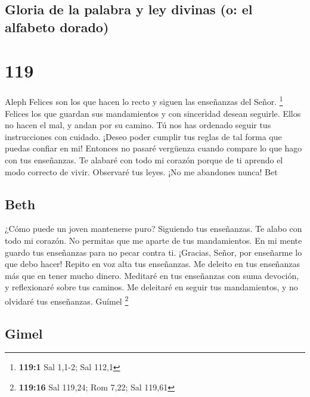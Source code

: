 \hypertarget{gloria-de-la-palabra-y-ley-divinas-o-el-alfabeto-dorado}{%
\subsection{Gloria de la palabra y ley divinas (o: el alfabeto
dorado)}\label{gloria-de-la-palabra-y-ley-divinas-o-el-alfabeto-dorado}}

\hypertarget{section-118}{%
\section{119}\label{section-118}}

Aleph  Felices son los que hacen lo recto y siguen las
enseñanzas del Señor. \footnote{\textbf{119:1} Sal 1,1-2; Sal 112,1}
 Felices los que guardan sus mandamientos y con sinceridad
desean seguirle.  Ellos no hacen el mal, y andan por su
camino.  Tú nos has ordenado seguir tus instrucciones con
cuidado.  ¡Deseo poder cumplir tus reglas de tal forma que
puedas confiar en mi!  Entonces no pasaré vergüenza cuando
compare lo que hago con tus enseñanzas.  Te alabaré con todo
mi corazón porque de ti aprendo el modo correcto de vivir. 
Observaré tus leyes. ¡No me abandones nunca! Bet

\hypertarget{beth}{%
\subsection{Beth}\label{beth}}

 ¿Cómo puede un joven mantenerse puro? Siguiendo tus
enseñanzas.  Te alabo con todo mi corazón. No permitas que
me aparte de tus mandamientos.  En mi mente guardo tus
enseñanzas para no pecar contra ti.  ¡Gracias, Señor, por
enseñarme lo que debo hacer!  Repito en voz alta tus
enseñanzas.  Me deleito en tus enseñanzas más que en tener
mucho dinero.  Meditaré en tus enseñanzas con suma
devoción, y reflexionaré sobre tus caminos.  Me deleitaré
en seguir tus mandamientos, y no olvidaré tus enseñanzas. Guímel
\footnote{\textbf{119:16} Sal 119,24; Rom 7,22; Sal 119,61}

\hypertarget{gimel}{%
\subsection{Gimel}\label{gimel}}

